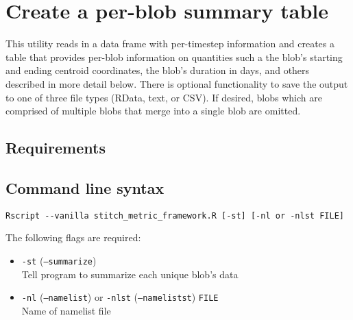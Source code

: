 \documentclass{article}
\begin{document}
\section{Create a per-blob summary table}\label{summarysection}
This utility reads in a data frame with per-timestep information and creates a table that provides per-blob information on quantities such a the blob's starting and ending centroid coordinates, the blob's duration in days, and others described in more detail below.  There is optional functionality to save the output to one of three file types (RData, text, or CSV). If desired, blobs which are comprised of multiple blobs that merge into a single blob are omitted.

\subsection{Requirements}


\subsection{Command line syntax}

\begin{verbatim}
Rscript --vanilla stitch_metric_framework.R [-st] [-nl or -nlst FILE]
\end{verbatim}

The following flags are required:
\begin{itemize}
\item[] \texttt{-st} (\texttt{--summarize})\\ Tell program to summarize each unique blob's data
\item[]\texttt{-nl} (\texttt{--namelist}) or \texttt{-nlst} (\texttt{--namelistst}) \texttt{FILE}\\ Name of namelist file
\end{itemize}
\end{document}
